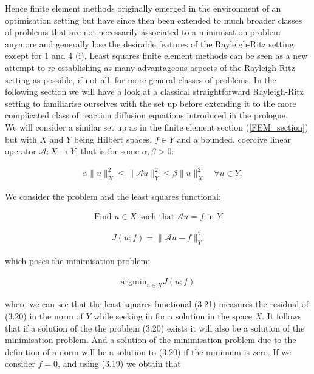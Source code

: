\documentclass[../draft_1.tex]{subfiles}
\begin{document}
Hence finite element methods originally emerged in the environment of an optimisation setting but have since then been extended to much broader classes of problems that are not necessarily associated to a minimisation problem anymore and generally lose the desirable features of the Rayleigh-Ritz setting except for 1 and 4 (i). Least squares finite element methods can be seen as a new attempt to re-establishing as many advantageous aspects of the Rayleigh-Ritz setting as possible, if not all, for more general classes of problems. In the following section we will have a look at a classical straightforward Rayleigh-Ritz setting to familiarise ourselves with the set up before extending it to the more complicated class of reaction diffusion equations introduced in the prologue.
\smallskip
\\
We will consider a similar set up as in the finite element section (\ref{FEM_section}) but with $X$ and $Y$ being Hilbert spaces, $f \in Y$ and a bounded, coercive linear operator $\mathcal{A}: X \rightarrow Y$, that is for some  $\alpha, \beta > 0$:
\begin{ceqn}
\begin{align}
\quad \alpha \| u \|_X^2 \leq \| \mathcal{A} u \|_Y^2 \leq \beta \| u \|_X^2 \quad \forall u \in Y.
\end{align} 
\end{ceqn}
We consider the problem and the least squares functional:
\begin{ceqn}
\begin{align}
 \text{Find } u \in X  \text{ such that} \ \mathcal{A} u = f \text{ in } Y	
\end{align}

\begin{align}
J(u; f) = \| \mathcal{A} u - f \|_Y^2
\end{align}
\end{ceqn}
which poses the minimisation problem:
 \begin{ceqn}
\begin{align}
\label{basic_min_problem}
\text{argmin}_{u \in X} J(u; f)
\end{align}
\end{ceqn}
where we can see that the least squares functional (3.21) measures the residual of (3.20) in the norm of $Y$ while seeking in for a solution in the space $X$. It follows that if a solution of the the problem (3.20) exists it will also be a solution of the minimisation problem. And a solution of the minimisation problem due to the definition of a norm will be a solution to (3.20) if the minimum is zero. If we consider $f = 0$, and using (3.19) we obtain that 
\end{document}
